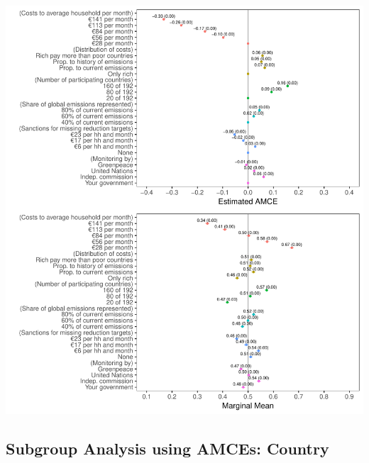 \documentclass[a4paper,12pt]{article}\usepackage[]{graphicx}\usepackage[]{color}
\makeatletter
\def\maxwidth{ %
  \ifdim\Gin@nat@width>\linewidth
    \linewidth
  \else
    \Gin@nat@width
  \fi
}
\newenvironment{knitrout}{}{} %
\makeatother
\begin{document}
\begin{knitrout}
\color{fgcolor}
\includegraphics[width=\maxwidth]{figure/bechtel_amce-1} 

\end{knitrout}










\clearpage

\subsection{Subgroup Analysis using AMCEs: Country}
\end{document}
